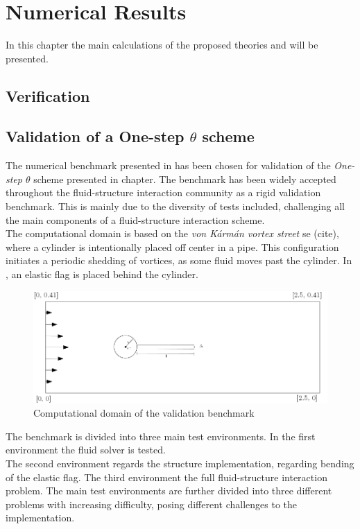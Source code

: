 \chapter{Numerical Results}

In this chapter the main calculations of the proposed theories and will be presented.

\section{Verification}

\section{Validation of a One-step $\theta$ scheme}
The numerical benchmark presented in \cite{Hron2006} has been chosen for validation of the \textit{One-step $\theta$} scheme presented in chapter. The benchmark has been widely accepted throughout the fluid-structure interaction community as a rigid validation benchmark. This is mainly due to the diversity of tests included, challenging all the main components of a fluid-structure interaction scheme. \\

The computational domain is based on the \textit{von Kármán vortex street} se (cite), where a cylinder is intentionally placed off center in a pipe. This configuration initiates a periodic shedding of vortices, as some fluid moves past the cylinder. In \cite{Hron2006}, an elastic flag is placed behind the cylinder. \\

\begin{figure}
  \centering
    \includegraphics[scale=0.5]{./Fig/turekflag.png}
      \caption{Computational domain of the validation benchmark}
\end{figure}
\newpage


The benchmark is divided into three main test environments.
In the first environment the fluid solver is tested. \\
The second environment regards the structure implementation, regarding bending of the elastic flag. The third environment the full fluid-structure interaction problem.
The main test environments are further divided into three different problems with increasing difficulty, posing different challenges to the implementation.

